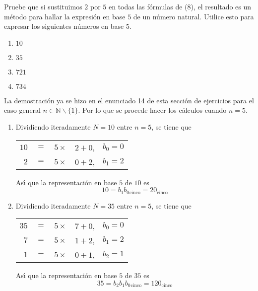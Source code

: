 \begin{enunciado}
 Pruebe que si sustituimos $2$ por $5$ en todas las f\'ormulas de (8), el resultado es un m\'etodo para hallar la expresi\'on en base $5$ de un n\'umero natural. Utilice esto para expresar los siguientes n\'umeros en base $5$.
 \begin{multicols}{4}
  \begin{enumerate}
   \item $10$
   \item $35$
   \item $721$
   \item $734$
  \end{enumerate}
 \end{multicols}
\end{enunciado}

\begin{solucion}
 La demostraci\'on ya se hizo en el enunciado 14 de esta secci\'on de ejercicios para el caso general $n\in\mathbb{N}\backslash\{ 1 \}$. Por lo que se procede hacer los c\'alculos cuando $n = 5$.
 \begin{enumerate}
  \item Dividiendo iteradamente $N=10$ entre $n=5$, se tiene que
  \begin{center}
   \begin{tabular}{rclrr}
    $10$ & $=$ & $5\times$ & $2 + 0$, & $b_0 = 0$ \\
    $2$ & $=$ & $5\times$ & $0 + 2$, & $b_1 = 2$
   \end{tabular}
  \end{center}
  As\'{\i} que la representaci\'on en base $5$ de $10$ es
  \begin{equation*}
   10 = b_1b_0{}_{\text{cinco}} = 20_{\text{cinco}}
  \end{equation*}

  \item Dividiendo iteradamente $N=35$ entre $n=5$, se tiene que
  \begin{center}
   \begin{tabular}{rclrr}
    $35$ & $=$ & $5\times$ & $7 + 0$, & $b_0 = 0$ \\
    $7$ & $=$ & $5\times$ & $1 + 2$, & $b_1 = 2$ \\
    $1$  & $=$ & $5\times$ & $0 + 1$, & $b_2 = 1$
   \end{tabular}
  \end{center}
  As\'{\i} que la representaci\'on en base $5$ de $35$ es
  \begin{equation*}
   35 = b_2b_1b_0{}_{\text{cinco}} = 120_{\text{cinco}}
  \end{equation*}


\end{enumerate}
\end{solucion}
